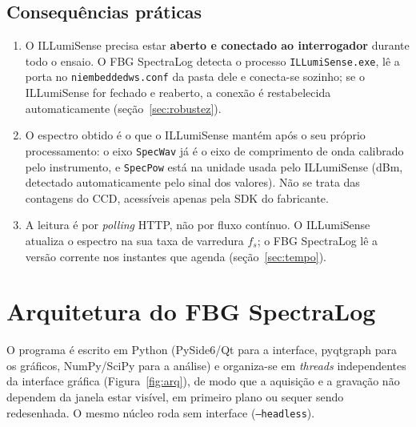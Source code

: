\documentclass[11pt,a4paper]{article}
\begin{document}
\subsection{Consequências práticas}
\begin{enumerate}
\item O ILLumiSense precisa estar \textbf{aberto e conectado ao interrogador} durante todo o ensaio.
  O FBG SpectraLog detecta o processo \texttt{ILLumiSense.exe}, lê a porta no
  \texttt{niembeddedws.conf} da pasta dele e conecta-se sozinho; se o ILLumiSense for fechado e
  reaberto, a conexão é restabelecida automaticamente (seção~\ref{sec:robustez}).
\item O espectro obtido é o que o ILLumiSense mantém após o seu próprio processamento: o eixo
  \texttt{SpecWav} já é o eixo de comprimento de onda calibrado pelo instrumento, e
  \texttt{SpecPow} está na unidade usada pelo ILLumiSense (dBm, detectado automaticamente pelo sinal
  dos valores). Não se trata das contagens do CCD, acessíveis apenas pela SDK do fabricante.
\item A leitura é por \emph{polling} HTTP, não por fluxo contínuo. O ILLumiSense atualiza o espectro na
  sua taxa de varredura $f_s$; o FBG SpectraLog lê a versão corrente nos instantes que agenda
  (seção~\ref{sec:tempo}).
\end{enumerate}

\section{Arquitetura do FBG SpectraLog}

O programa é escrito em Python (PySide6/Qt para a interface, pyqtgraph para os gráficos, NumPy/SciPy
para a análise) e organiza-se em \emph{threads} independentes da interface gráfica
(Figura~\ref{fig:arq}), de modo que a aquisição e a gravação não dependem da janela estar visível,
em primeiro plano ou sequer sendo redesenhada. O mesmo núcleo roda sem interface
(\texttt{--headless}).
\end{document}
